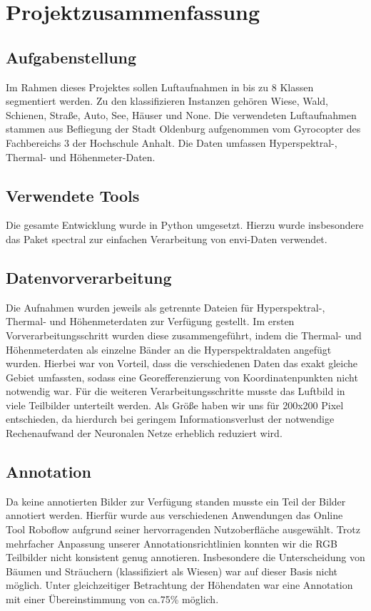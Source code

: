 \newpage %

\chapter{Projektzusammenfassung}\thispagestyle{fancy}

\section{Aufgabenstellung}
Im Rahmen dieses Projektes sollen Luftaufnahmen in bis zu 8 Klassen segmentiert werden.
Zu den klassifizieren Instanzen gehören Wiese, Wald, Schienen, Straße, Auto, See, Häuser und None.
Die verwendeten Luftaufnahmen stammen aus Befliegung der Stadt Oldenburg aufgenommen vom Gyrocopter des Fachbereichs 3
der Hochschule Anhalt.
Die Daten umfassen Hyperspektral-, Thermal- und Höhenmeter-Daten.

\section{Verwendete Tools}
Die gesamte Entwicklung wurde in Python umgesetzt.
Hierzu wurde insbesondere das Paket spectral zur einfachen Verarbeitung von envi-Daten verwendet.

\section{Datenvorverarbeitung}
Die Aufnahmen wurden jeweils als getrennte Dateien für Hyperspektral-, Thermal- und Höhenmeterdaten zur Verfügung gestellt.
Im ersten Vorverarbeitungsschritt wurden diese zusammengeführt, indem die Thermal- und Höhenmeterdaten als einzelne Bänder an die Hyperspektraldaten angefügt wurden.
Hierbei war von Vorteil, dass die verschiedenen Daten das exakt gleiche Gebiet umfassten, sodass eine Georefferenzierung von Koordinatenpunkten nicht notwendig war.
Für die weiteren Verarbeitungsschritte musste das Luftbild in viele Teilbilder unterteilt werden.
Als Größe haben wir uns für 200x200 Pixel entschieden, da hierdurch bei geringem Informationsverlust der notwendige Rechenaufwand der Neuronalen Netze erheblich reduziert wird.


\section{Annotation}
Da keine annotierten Bilder zur Verfügung standen musste ein Teil der Bilder annotiert werden.
Hierfür wurde aus verschiedenen Anwendungen das Online Tool Roboflow aufgrund seiner hervorragenden Nutzoberfläche ausgewählt.
Trotz mehrfacher Anpassung unserer Annotationsrichtlinien konnten wir die RGB Teilbilder nicht konsistent genug annotieren.
Insbesondere die Unterscheidung von Bäumen und Sträuchern (klassifiziert als Wiesen) war auf dieser Basis nicht möglich.
Unter gleichzeitiger Betrachtung der Höhendaten war eine Annotation mit einer Übereinstimmung von ca.75\% möglich.

